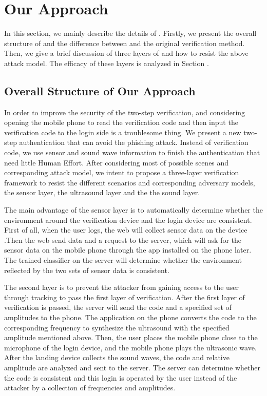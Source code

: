 \section{Our Approach}
\label{sec:approach}
In this section, we mainly describe the details of \name. Firstly, we present the overall structure of \Name and the difference between \Name and the original verification method. Then, we give a brief discussion of three layers of \Name and how to resist the above attack model. The efficacy of these layers is analyzed in Section \uppercase\expandafter{}. 


\subsection{Overall Structure of Our Approach}
In order to improve the security of the two-step verification, and considering opening the mobile phone to read the verification code and then input the verification code to the login side is a troublesome thing. We present a new two-step authentication that can avoid the phishing attack. Instead of verification code, we use sensor and sound wave information to finish the authentication that need little Human Effort. After considering most of possible scenes and corresponding attack model, we intent to propose a three-layer verification framework to resist the different scenarios and corresponding adversary models, the sensor layer, the ultrasound layer and the the sound layer. 




The main advantage of the sensor layer is to automatically determine whether the environment around the verification device and the login device are consistent. First of all, when the user logs, the web will collect sensor data on the device .Then the web send data and a request to the server, which will ask for the sensor data on the mobile phone through the app installed on the phone later. The trained classifier on the server will determine whether the environment reflected by the two sets of sensor data is consistent.




The second layer is to prevent the attacker from gaining access to the user through tracking to pass the first layer of verification. After the first layer of verification is passed, the server will send the code and a specified set of amplitudes to the phone. The application on the phone converts the code to the corresponding frequency to synthesize the ultrasound with the specified amplitude mentioned above. Then, the user places the mobile phone close to the microphone of the login device, and the mobile phone plays the ultrasonic wave. After the landing device collects the sound waves, the code and relative amplitude are analyzed and sent to the server. The server can determine whether the code is consistent and this login is operated by the user instead of the attacker by a collection of frequencies and amplitudes.




